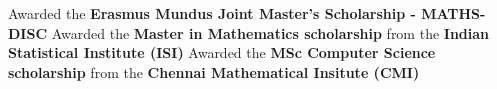 {}
{Awarded the \textbf{Erasmus Mundus Joint Master's Scholarship - MATHS-DISC }}
{}
%
%
{}
{Awarded the \textbf{Master in Mathematics scholarship} from the \textbf{Indian Statistical Institute (ISI)}}
{}
%
%
{}
{Awarded the \textbf{MSc Computer Science scholarship} from the \textbf{Chennai Mathematical Insitute (CMI)}}
{}
